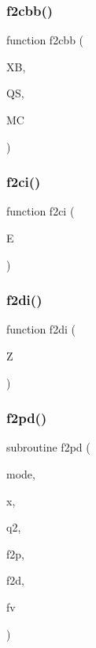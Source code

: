 \mbox{\label{djangoh__h_8f_ad21686603a997dca7276e97fdd737e95}} 
\subsubsection{\texorpdfstring{f2cbb()}{f2cbb()}}
{\footnotesize\ttfamily function f2cbb (\begin{DoxyParamCaption}\item[{}]{XB,  }\item[{}]{QS,  }\item[{}]{MC }\end{DoxyParamCaption})}

\mbox{\label{djangoh__h_8f_a2ab06e9e548400420656b6514b985cb4}} 
\subsubsection{\texorpdfstring{f2ci()}{f2ci()}}
{\footnotesize\ttfamily function f2ci (\begin{DoxyParamCaption}\item[{}]{E }\end{DoxyParamCaption})}

\mbox{\label{djangoh__h_8f_a66aa9c3ae1cb33ef750c36b69352492f}} 
\subsubsection{\texorpdfstring{f2di()}{f2di()}}
{\footnotesize\ttfamily function f2di (\begin{DoxyParamCaption}\item[{}]{Z }\end{DoxyParamCaption})}

\mbox{\label{djangoh__h_8f_a67daa21721b2c5babecb24bd220d034f}} 
\subsubsection{\texorpdfstring{f2pd()}{f2pd()}}
{\footnotesize\ttfamily subroutine f2pd (\begin{DoxyParamCaption}\item[{}]{mode,  }\item[{}]{x,  }\item[{}]{q2,  }\item[{}]{f2p,  }\item[{}]{f2d,  }\item[{}]{fv }\end{DoxyParamCaption})}



